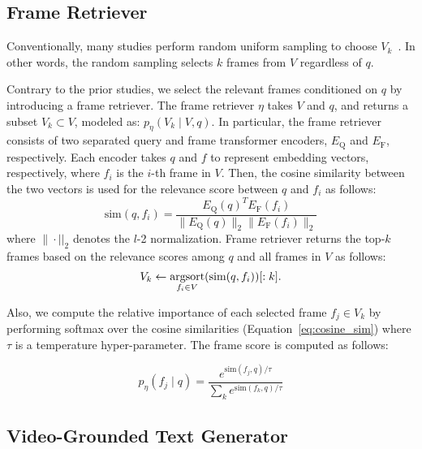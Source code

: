 \documentclass{article}
\begin{document}
\subsection{Frame Retriever}

Conventionally, many studies perform random uniform sampling to choose $V_k$~\cite{lei2021less,zellers2021merlot, wang2022all,yang2022zero}. In other words, the random sampling selects $k$ frames from $V$ regardless of $q$.




Contrary to the prior studies, we select the relevant frames conditioned on $q$ by introducing a frame retriever. The frame retriever $\eta$ takes $V$ and $q$, and returns a subset $V_k \subset V$, modeled as: $p_\eta(V_k \mid V, q)$. In particular, the frame retriever consists of two separated query and frame transformer encoders, $E_\text{Q}$ and $E_\text{F}$, respectively. Each encoder takes $q$ and $f$ to represent embedding vectors, respectively, where $f_i$ is the $i$-th frame in $V$. Then, the cosine similarity between the two vectors is used for the relevance score between $q$ and $f_i$ as follows:
\begin{equation}
    \text{sim}(q, f_i) = \frac{E_\text{Q}(q)^T E_\text{F}(f_i)}{\|E_\text{Q}(q)\|_2 \|E_\text{F}(f_i)\|_2}
    \label{eq:cosine_sim}
\end{equation}
where $\|\cdot||_2$ denotes the $l$-2 normalization.
Frame retriever returns the top-$k$ frames based on the relevance scores among $q$ and all frames in $V$ as follows:
\begin{equation}
    V_k \leftarrow \operatorname*{argsort}_{f_i \in V}(\text{sim}(q, f_i))[:k].
    \label{eq:argsort}
\end{equation}

Also, we compute the relative importance of each selected frame $f_j \in V_k$ by performing softmax over the cosine similarities (Equation~\ref{eq:cosine_sim}) where $\tau$ is a temperature hyper-parameter. The frame score is computed as follows:

\begin{equation}
    p_{\eta}(f_j \mid q) = \frac{e^{\text{sim}(f_j, q)/\tau}}{\sum_k e^{\text{sim}(f_k, q)/\tau}}
    \label{eq:frame_score}
\end{equation}

\subsection{Video-Grounded Text Generator}
\end{document}
